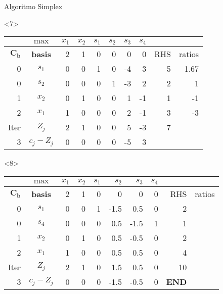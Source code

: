 \begin{frameExample}{Algoritmo Simplex}{}
\begin{onlyenv}<7>
      {\centering
      \begin{tabular}{rc|rrrrrr|rr}
  &  $\max$ & $x_1$ & $x_2$ & $s_1$ &$ s_2$ & $s_3$ & $s_4$ & & \\
  \toprule
$\mathbf{C_b}$ & \textbf{basis} & 2 & 1 & 0 & 0 & 0 & 0 & RHS & ratios \\
  \midrule
0 & $s_1$ & 0 & 0 & 1 & 0 & -4 & 3 & 5 & 1.67 \\
0 & $s_2$ & 0 & 0 & 0 & 1 & -3 & \cellcolor{yellow}2 & 2 & 1 \\
1 & $x_2$ & 0 & 1 & 0 & 0 & 1 & -1 & 1 & -1 \\
        2 & $x_1$ & 1 & 0 & 0 & 0 & 2 & -1 & 3 & -3 \\
        \midrule
Iter & $Z_j$ & 2 & 1 & 0 & 0 & 5 & -3 & 7 &  \\
3 & $c_j - Z_j$ & 0 & 0 & 0 & 0 & -5 & 3 &  & 
\end{tabular}
  \par}
\end{onlyenv}

\begin{onlyenv}<8>
      {\centering
      \begin{tabular}{rc|rrrrrr|rr}
  &  $\max$ & $x_1$ & $x_2$ & $s_1$ &$ s_2$ & $s_3$ & $s_4$ & & \\
  \toprule
$\mathbf{C_b}$ & \textbf{basis} & 2 & 1 & 0 & 0 & 0 & 0 & RHS & ratios \\
  \midrule
0 & $s_1$ & 0 & 0 & 1 & -1.5 & 0.5 & 0 & 2 &  \\
0 & $s_4$ & 0 & 0 & 0 & 0.5 & -1.5 & \cellcolor{yellow}1 & 1 &  \\
1 & $x_2$ & 0 & 1 & 0 & 0.5 & -0.5 & 0 & 2 &  \\
        2 & $x_1$ & 1 & 0 & 0 & 0.5 & 0.5 & 0 & 4 &  \\
        \midrule
Iter & $Z_j$ & 2 & 1 & 0 & 1.5 & 0.5 & 0 & 10 &  \\
3 & $c_j - Z_j$ & 0 & 0 & 0 & -1.5 & -0.5 & 0 &\textbf{END}  & 
\end{tabular}
  \par}
\end{onlyenv}


\end{frameExample}
